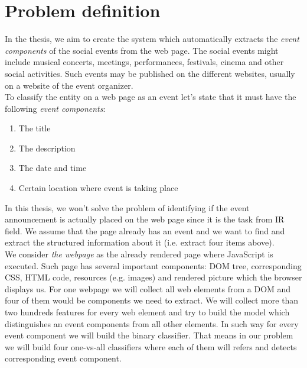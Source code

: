 \section{Problem definition}
In the thesis, we aim to create the system which automatically extracts the \textit{event components} of the social events from the web page. The social events might include musical concerts, meetings, performances, festivals, cinema and other social activities. Such events may be published on the different websites, usually on a website of the event organizer.\\

To classify the entity on a web page as an event let's state that it must have the following \textit{event components}:
\begin{enumerate}
    \item The title
    \item The description
    \item The date and time
    \item Certain location where event is taking place
\end{enumerate}

In this thesis, we won't solve the problem of identifying if the event announcement is actually placed on the web page since it is the task from IR field. We assume that the page already has an event and we want to find and extract the structured information about it (i.e. extract four items above).\\

We consider \textit{the webpage} as the already rendered page where JavaScript is executed. Such page has several important components: DOM tree, corresponding CSS, HTML code, resources (e.g. images) and rendered picture which the browser displays us. For one webpage we will collect all web elements from a DOM and four of them would be components we need to extract. We will collect more than two hundreds features for every web element and try to build the model which distinguishes an event components from all other elements. In such way for every event component we will build the binary classifier. That means in our problem we will build four one-vs-all classifiers where each of them will refers and detects corresponding event component. 

